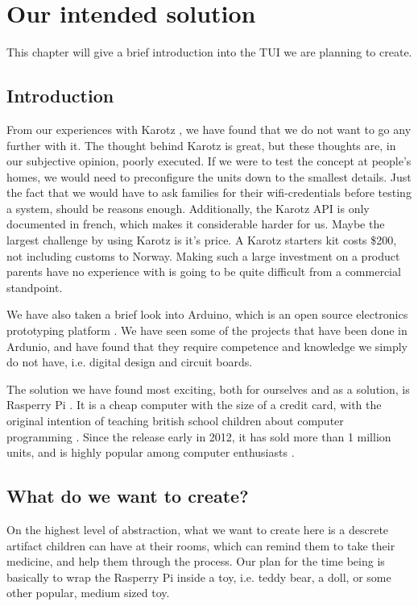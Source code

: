 
\chapter{Our intended solution}
\label{chp:our-solution}

This chapter will give a brief introduction into the TUI we are planning to create. 

\section{Introduction}
\label{sec:our-solution-introduction}
From our experiences with Karotz \cite{karotz}, we have found that we do not want to go any further with it. The thought behind Karotz is great, but these thoughts are, in our subjective opinion, poorly executed. If we were to test the concept at people's homes, we would need to preconfigure the units down to the smallest details. Just the fact that we would have to ask families for their wifi-credentials before testing a system, should be reasons enough.
Additionally, the Karotz API is only documented in french, which makes it considerable harder for us. Maybe the largest challenge by using Karotz is it's price. A Karotz starters kit costs \$200, not including customs to Norway. Making such a large investment on a product parents have no experience with is going to be quite difficult from a commercial standpoint.  


We have also taken a brief look into Arduino, which is an open source electronics prototyping platform \cite{arduino}. We have seen some of the projects that have been done in Ardunio, and have found that they require competence and knowledge we simply do not have, i.e. digital design and circuit boards. 


The solution we have found most exciting, both for ourselves and as a solution, is Rasperry Pi \cite{rasperrypi}. It is a cheap computer with the size of a credit card, with the original intention of teaching british school children about computer programming \cite{rasperrypi-about}. Since the release early in 2012, it has sold more than 1 million units, and is highly popular among computer enthusiasts \cite{pimillion}. 


\section{What do we want to create?}
On the highest level of abstraction, what we want to create here is a descrete artifact children can have at their rooms, which can remind them to take their medicine, and help them through the process. Our plan for the time being is basically to wrap the Rasperry Pi inside a toy, i.e. teddy bear, a doll, or some other popular, medium sized toy.

